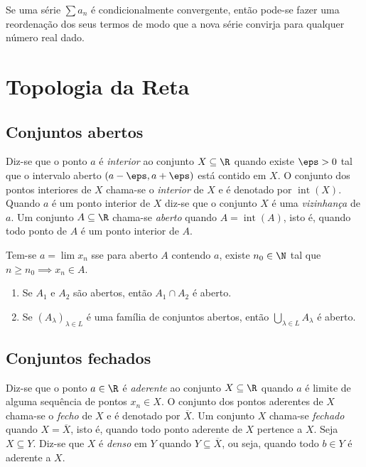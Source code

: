 \documentclass{article}
\begin{document}
\begin{thm} [Riemann]
    Se uma série \(\sum a_n\) é condicionalmente convergente, então pode-se fazer uma reordenação dos seus termos de modo que a nova série convirja para qualquer número real dado.
\end{thm}

\section{Topologia da Reta}
\subsection{Conjuntos abertos}

\begin{defn}
    Diz-se que o ponto \(a\) é \emph{interior} ao conjunto \(X \subseteq \R\) quando existe \(\eps > 0\) tal que o intervalo aberto \((a - \eps, a + \eps)\) está contido em \(X\). O conjunto dos pontos interiores de \(X\) chama-se o \emph{interior} de \(X\) e é denotado por \(\operatorname{int}(X)\).
    Quando \(a\) é um ponto interior de \(X\) diz-se que o conjunto \(X\) é uma \emph{vizinhança} de \(a\). Um conjunto \(A \subseteq \R\) chama-se \emph{aberto} quando \(A = \operatorname{int}(A)\), isto é, quando todo ponto de \(A\) é um ponto interior de \(A\).
\end{defn}

\begin{prop}
    Tem-se \(a = \lim x_n\) sse para aberto \(A\) contendo \(a\), existe \(n_0 \in \N\) tal que \(n \geq n_0 \implies x_n \in A\).
\end{prop}

\begin{thm} 
    \begin{enumerate}
        \item [(a)] Se \(A_1\) e \(A_2\) são abertos, então \(A_1 \cap A_2\) é aberto.
        \item [(b)] Se \((A_\lambda)_{\lambda \in L}\) é uma família de conjuntos abertos, então \(\bigcup_{\lambda \in L} A_\lambda\) é aberto.
    \end{enumerate}
\end{thm}

\subsection{Conjuntos fechados}

\begin{defn}
    Diz-se que o ponto \(a \in \R\) é \emph{aderente} ao conjunto \(X \subseteq \R\) quando \(a\) é limite de alguma sequência de pontos \(x_n \in X\). O conjunto dos pontos aderentes de \(X\) chama-se o \emph{fecho} de \(X\) e é denotado por \(\overline{X}\).
    Um conjunto \(X\) chama-se \emph{fechado} quando \(X = \overline{X}\), isto é, quando todo ponto aderente de \(X\) pertence a \(X\). Seja \(X \subseteq Y\). Diz-se que \(X\) é \emph{denso} em \(Y\) quando \(Y \subseteq \overline{X}\), ou seja, quando todo \(b \in Y\) é aderente a \(X\).
\end{defn}
\end{document}
